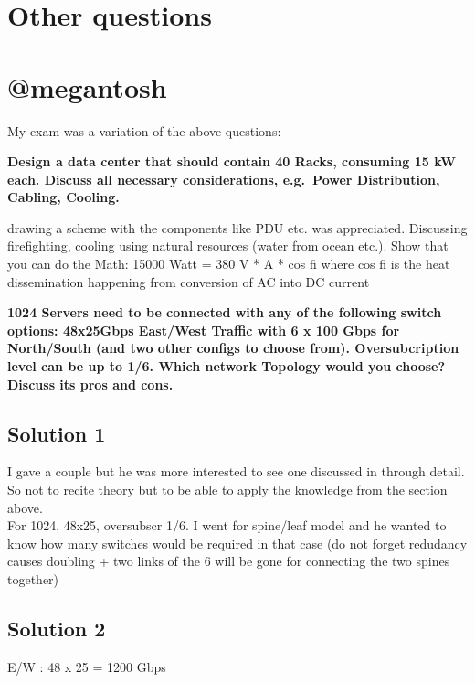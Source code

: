 \hypertarget{other-questions}{%
\section{Other questions}\label{other-questions}}

\hypertarget{megantosh}{%
\section{@megantosh}\label{megantosh}}

My exam was a variation of the above questions:

\textbf{Design a data center that should contain 40 Racks, consuming 15
kW each. Discuss all necessary considerations, e.g.~Power Distribution,
Cabling, Cooling.}

drawing a scheme with the components like PDU etc. was appreciated.
Discussing firefighting, cooling using natural resources (water from
ocean etc.). Show that you can do the Math: 15000 Watt = 380 V * A * cos
fi where cos fi is the heat dissemination happening from conversion of
AC into DC current

\textbf{1024 Servers need to be connected with any of the following
switch options: 48x25Gbps East/West Traffic with 6 x 100 Gbps for
North/South (and two other configs to choose from). Oversubcription
level can be up to 1/6. Which network Topology would you choose? Discuss
its pros and cons.}

\hypertarget{solution-1-1}{%
\subsection{Solution 1}\label{solution-1-1}}

I gave a couple but he was more interested to see one discussed in
through detail. So not to recite theory but to be able to apply the
knowledge from the section above.\\
For 1024, 48x25, oversubscr 1/6. I went for spine/leaf model and he
wanted to know how many switches would be required in that case (do not
forget redudancy causes doubling + two links of the 6 will be gone for
connecting the two spines together)

\hypertarget{solution-2-2}{%
\subsection{Solution 2}\label{solution-2-2}}

E/W : 48 x 25 = 1200 Gbps


